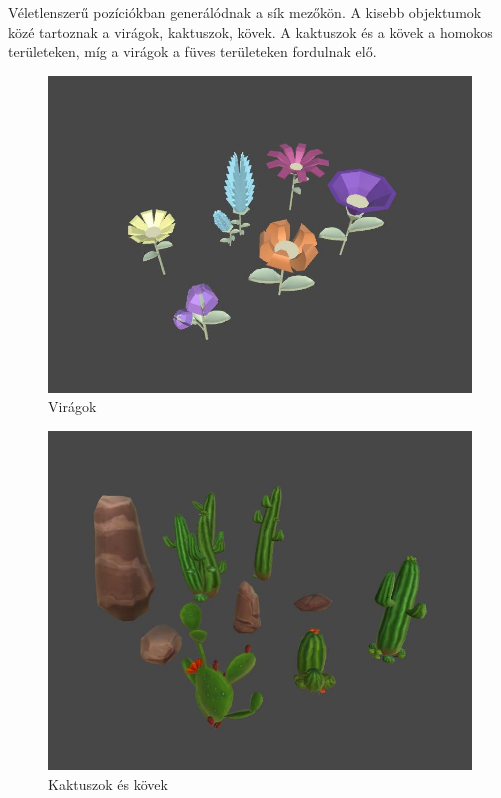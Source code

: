 Véletlenszerű pozíciókban generálódnak a sík mezőkön. A kisebb objektumok közé tartoznak a virágok, kaktuszok, kövek. A kaktuszok és a kövek a homokos területeken, míg a virágok a füves területeken fordulnak elő.
\newline
\newline

\begin{figure}[h]
\centering
\includegraphics[scale=0.5]{kepek/img11_4_7_4.JPG}
\caption{Virágok}
\label{fig:img11_4_7_4}
\end{figure}

\begin{figure}[h]
\centering
\includegraphics[scale=0.5]{kepek/img11_4_7_5.JPG}
\caption{Kaktuszok és kövek}
\label{fig:img11_4_7_5}
\end{figure}

